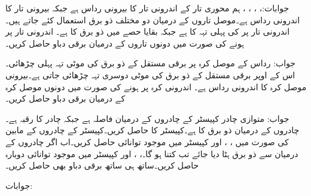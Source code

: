 جوابات:، ، ، ،  
ہم محوری تار کے اندرونی تار کا بیرونی رداس  ہے جبکہ بیرونی تار کا اندرونی رداس  ہے۔موصل تاروں کے درمیان دو مختلف ذو برق استعمال کئے جاتے ہیں۔ اندرونی تار پر  کی پہلی تہہ کا  ہے جبکہ بقایا حصے میں ذو برق کا  ہے۔ اندرونی تار پر  ہونے کی صورت میں دونوں تاروں کے درمیان برقی دباو حاصل کریں۔

جواب:
رداس  کے موصل کرہ پر  برقی مستقل کے ذو برق کی  موٹی تہہ پہلی چڑھائی۔اس کے اوپر  برقی مستقل کے ذو برق کی  موٹی دوسری تہہ چڑھائی جاتی ہے۔بیرونی موصل کرہ کا اندرونی رداس  ہے۔ اندرونی کرہ پر  ہونے کی صورت میں دونوں موصل کرہ کے درمیان برقی دباو حاصل کریں۔

جواب:
متوازی چادر کپیسٹر کے چادروں کے درمیان فاصلہ  ہے جبکہ چادر کا رقبہ  ہے۔چادروں کے درمیان ذو برق کا  ہے۔کپیسٹر کا  حاصل کریں۔کپیسٹر کے چادروں کے مابین  کی صورت میں ، ،  اور کپیسٹر میں موجود توانائی  حاصل کریں۔اب اگر چادروں کے درمیان سے ذو برق ہٹا دیا جائے تب  کتنا ہو گا۔، ،  اور کپیسٹر میں موجود توانائی  دوبارہ حاصل کریں۔ساتھ ہی ساتھ برقی دباو بھی حاصل کریں۔

جوابات:
